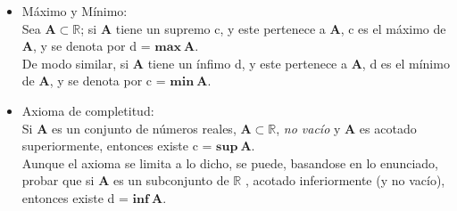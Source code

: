 \documentclass[a4paper,11pt]{report}
\begin{document}
\begin{itemize}
\item Máximo y Mínimo: \\
Sea $\mathbf{A} \subset \mathbb{R}$; si $\mathbf{A}$ tiene un supremo c, y este pertenece a $\mathbf{A}$, c es el máximo de $\mathbf{A}$, y se denota por d =  $\mathbf{max\ A}$. \\
De modo similar, si $\mathbf{A}$  tiene un ínfimo d, y este pertenece a $\mathbf{A}$, d es el mínimo de $\mathbf{A}$, y se denota por c = $\mathbf{min\ A}$.
\item Axioma de completitud: \\
Si $\mathbf{A}$ es un conjunto de números reales, $\mathbf{A} \subset \mathbb{R}$, \emph {no vacío} y $\mathbf{A}$ es acotado superiormente, entonces existe c = $\mathbf{sup\ A}$. \\
Aunque el axioma se limita a lo dicho, se puede, basandose en lo enunciado, probar que si $\mathbf{A}$ es un subconjunto de $\mathbb{R}$ , acotado inferiormente (y no vacío), entonces existe d = $\mathbf{inf\ A}$.

\newpage



\end{itemize}
\end{document}
